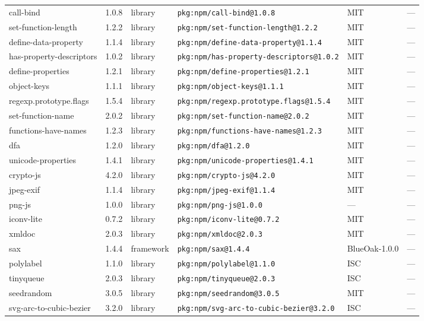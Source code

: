 \documentclass[11pt]{article}
\begin{document}
\begin{longtable}{|l|l|l|p{2.2cm}|l|p{4cm}|}
call-bind & 1.0.8 & library & \texttt{pkg:npm/call-bind@1.0.8} & MIT & — \\
set-function-length & 1.2.2 & library & \texttt{pkg:npm/set-function-length@1.2.2} & MIT & — \\
define-data-property & 1.1.4 & library & \texttt{pkg:npm/define-data-property@1.1.4} & MIT & — \\
has-property-descriptors & 1.0.2 & library & \texttt{pkg:npm/has-property-descriptors@1.0.2} & MIT & — \\
define-properties & 1.2.1 & library & \texttt{pkg:npm/define-properties@1.2.1} & MIT & — \\
object-keys & 1.1.1 & library & \texttt{pkg:npm/object-keys@1.1.1} & MIT & — \\
regexp.prototype.flags & 1.5.4 & library & \texttt{pkg:npm/regexp.prototype.flags@1.5.4} & MIT & — \\
set-function-name & 2.0.2 & library & \texttt{pkg:npm/set-function-name@2.0.2} & MIT & — \\
functions-have-names & 1.2.3 & library & \texttt{pkg:npm/functions-have-names@1.2.3} & MIT & — \\
dfa & 1.2.0 & library & \texttt{pkg:npm/dfa@1.2.0} & MIT & — \\
unicode-properties & 1.4.1 & library & \texttt{pkg:npm/unicode-properties@1.4.1} & MIT & — \\
crypto-js & 4.2.0 & library & \texttt{pkg:npm/crypto-js@4.2.0} & MIT & — \\
jpeg-exif & 1.1.4 & library & \texttt{pkg:npm/jpeg-exif@1.1.4} & MIT & — \\
png-js & 1.0.0 & library & \texttt{pkg:npm/png-js@1.0.0} & — & — \\
iconv-lite & 0.7.2 & library & \texttt{pkg:npm/iconv-lite@0.7.2} & MIT & — \\
xmldoc & 2.0.3 & library & \texttt{pkg:npm/xmldoc@2.0.3} & MIT & — \\
sax & 1.4.4 & framework & \texttt{pkg:npm/sax@1.4.4} & BlueOak-1.0.0 & — \\
polylabel & 1.1.0 & library & \texttt{pkg:npm/polylabel@1.1.0} & ISC & — \\
tinyqueue & 2.0.3 & library & \texttt{pkg:npm/tinyqueue@2.0.3} & ISC & — \\
seedrandom & 3.0.5 & library & \texttt{pkg:npm/seedrandom@3.0.5} & MIT & — \\
svg-arc-to-cubic-bezier & 3.2.0 & library & \texttt{pkg:npm/svg-arc-to-cubic-bezier@3.2.0} & ISC & — \\

\end{longtable}
\end{document}

